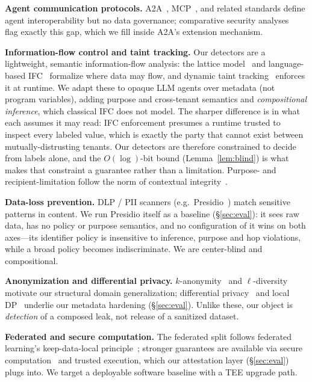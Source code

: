 \documentclass{article}
\begin{document}
\noindent\textbf{Agent communication protocols.} A2A~\citep{a2a}, MCP~\citep{mcp},
and related standards define agent interoperability but no data governance;
comparative security analyses~\citep{protosec,protoexploit} flag exactly this gap,
which we fill inside A2A's extension mechanism.

\noindent\textbf{Information-flow control and taint tracking.} Our detectors are a
lightweight, semantic information-flow analysis: the lattice model~\citep{denning76}
and language-based IFC~\citep{sabelfeld03} formalize where data may flow, and
dynamic taint tracking~\citep{taintdroid} enforces it at runtime. We adapt these to
opaque LLM agents over metadata (not program variables), adding purpose and
cross-tenant semantics and \emph{compositional inference}, which classical IFC
does not model. The sharper difference is in what each assumes it may read: IFC
enforcement presumes a runtime trusted to inspect every labeled value, which is
exactly the party that cannot exist between mutually-distrusting tenants. Our
detectors are therefore constrained to decide from labels alone, and the
$O(\log)$-bit bound (Lemma~\ref{lem:blind}) is what makes that constraint a
guarantee rather than a limitation. Purpose- and recipient-limitation follow the norm of contextual
integrity~\citep{ci}.

\noindent\textbf{Data-loss prevention.} DLP / PII scanners (e.g.\
Presidio~\citep{presidio}) match sensitive patterns in content. We run Presidio
itself as a baseline (\S\ref{sec:eval}): it sees raw data, has no policy or purpose
semantics, and no configuration of it wins on both axes---its identifier policy is
insensitive to inference, purpose and hop violations, while a broad policy becomes
indiscriminate. We are center-blind and compositional.

\noindent\textbf{Anonymization and differential privacy.} $k$-anonymity~\citep{ksweeney}
and $\ell$-diversity~\citep{ldiv} motivate our structural domain generalization;
differential privacy~\citep{dwork06,dworkroth} and local DP~\citep{rappor} underlie
our metadata hardening (\S\ref{sec:eval}). Unlike these, our object is \emph{detection} of a
composed leak, not release of a sanitized dataset.

\noindent\textbf{Federated and secure computation.} The federated split follows
federated learning's keep-data-local principle~\citep{fedavg}; stronger guarantees
are available via secure computation~\citep{yao} and trusted execution, which our
attestation layer (\S\ref{sec:eval}) plugs into. We target a deployable software baseline with a
TEE upgrade path.
\end{document}
